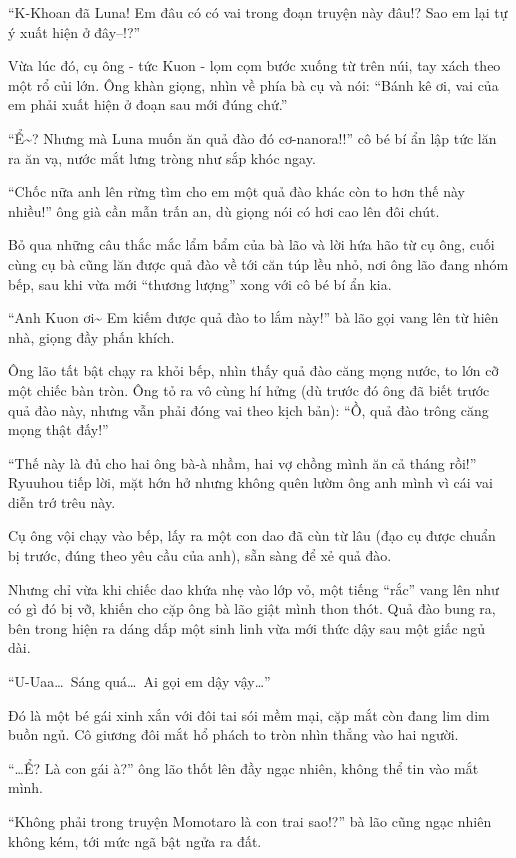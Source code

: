 \documentclass[../main.tex]{subfiles}
\begin{document}
``K-Khoan đã Luna! Em đâu có có vai trong đoạn truyện này đâu!? Sao em lại tự ý xuất hiện ở đây--!?''

Vừa lúc đó, cụ ông - tức Kuon - lọm cọm bước xuống từ trên núi, tay xách theo một rổ củi lớn. Ông khàn giọng, nhìn về phía bà cụ và nói: ``Bánh kê ơi, vai của em phải xuất hiện ở đoạn sau mới đúng chứ.''

``Ể\~{}? Nhưng mà Luna muốn ăn quả đào đó cơ-nanora!!'' cô bé bí ẩn lập tức lăn ra ăn vạ, nước mắt lưng tròng như sắp khóc ngay.

``Chốc nữa anh lên rừng tìm cho em một quả đào khác còn to hơn thế này nhiều!'' ông già cần mẫn trấn an, dù giọng nói có hơi cao lên đôi chút.

Bỏ qua những câu thắc mắc lẩm bẩm của bà lão và lời hứa hão từ cụ ông, cuối cùng cụ bà cũng lăn được quả đào về tới căn túp lều nhỏ, nơi ông lão đang nhóm bếp, sau khi vừa mới ``thương lượng'' xong với cô bé bí ẩn kia.

``Anh Kuon ơi\~{} Em kiếm được quả đào to lắm này!'' bà lão gọi vang lên từ hiên nhà, giọng đầy phấn khích.

Ông lão tất bật chạy ra khỏi bếp, nhìn thấy quả đào căng mọng nước, to lớn cỡ một chiếc bàn tròn. Ông tỏ ra vô cùng hí hửng (dù trước đó ông đã biết trước quả đào này, nhưng vẫn phải đóng vai theo kịch bản): ``Ồ, quả đào trông căng mọng thật đấy!''

``Thế này là đủ cho hai ông bà-à nhầm, hai vợ chồng mình ăn cả tháng rồi!'' Ryuuhou tiếp lời, mặt hớn hở nhưng không quên lườm ông anh mình vì cái vai diễn trớ trêu này.

Cụ ông vội chạy vào bếp, lấy ra một con dao đã cùn từ lâu (đạo cụ được chuẩn bị trước, đúng theo yêu cầu của anh), sẵn sàng để xẻ quả đào.

Nhưng chỉ vừa khi chiếc dao khứa nhẹ vào lớp vỏ, một tiếng ``rắc'' vang lên như có gì đó bị vỡ, khiến cho cặp ông bà lão giật mình thon thót. Quả đào bung ra, bên trong hiện ra dáng dấp một sinh linh vừa mới thức dậy sau một giấc ngủ dài.

``U-Uaa\dots\ Sáng quá\dots\ Ai gọi em dậy vậy\dots''

Đó là một bé gái xinh xắn với đôi tai sói mềm mại, cặp mắt còn đang lim dim buồn ngủ. Cô giương đôi mắt hổ phách to tròn nhìn thẳng vào hai người.

``\dots Ể? Là con gái à?'' ông lão thốt lên đầy ngạc nhiên, không thể tin vào mắt mình.

``Không phải trong truyện Momotaro là con trai sao!?'' bà lão cũng ngạc nhiên không kém, tới mức ngã bật ngửa ra đất.
\end{document}
